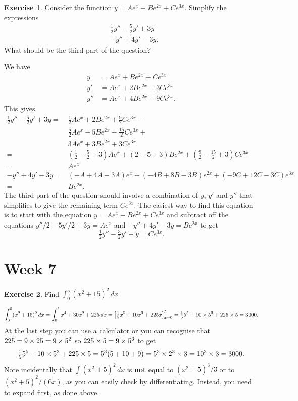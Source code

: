 \documentclass[a4paper]{amsart}
\theoremstyle{definition}
\newtheorem{exercise}{Exercise}[section]
\newenvironment{solution}{{\noindent \bf Solution:}}{}
\begin{document}
\begin{exercise}\label{ex-diffproj}
Consider the function $y=Ae^x+Be^{2x}+Ce^{3x}$.  Simplify
 the expressions
 \begin{align*}
   & \tfrac{1}{2}y'' - \tfrac{5}{2}y' + 3y \\
   & -y'' + 4 y' - 3y.
 \end{align*}
 What should be the third part of the question?
\end{exercise}
\begin{solution}
We have 
 \begin{align*}
  y   &= Ae^x +  Be^{2x} +  Ce^{3x} \\
  y'  &= Ae^x + 2Be^{2x} + 3Ce^{3x} \\
  y'' &= Ae^x + 4Be^{2x} + 9Ce^{3x}.
 \end{align*}
 This gives
 \begin{align*}
  \tfrac{1}{2}y'' - \tfrac{5}{2}y' + 3y 
   =& \tfrac{1}{2}Ae^x + 2Be^{2x} + \tfrac{9}{2}Ce^{3x} - \\
    & \tfrac{5}{2}Ae^x - 5Be^{2x} - \tfrac{15}{2}Ce^{3x} + \\
    & 3Ae^x + 3Be^{2x} + 3Ce^{3x} \\
   =& (\tfrac{1}{2}-\tfrac{5}{2}+3)Ae^x +
      (2-5+3)Be^{2x} + (\tfrac{9}{2}-\tfrac{15}{2}+3)Ce^{3x} \\
   =& Ae^x \\
  -y''+4y'-3y 
   =& (-A+4A-3A)e^x + (-4B+8B-3B)e^{2x} + (-9C+12C-3C)e^{3x} \\
   =& Be^{2x}.
 \end{align*}
 The third part of the question should involve a combination
 of $y$, $y'$ and $y''$ that simplifies to give the
 remaining term $Ce^{3x}$.  The easiest way to find this
 equation is to start with the equation
 $y=Ae^x+Be^{2x}+Ce^{3x}$ and subtract off the equations
 $y''/2-5y'/2+3y=Ae^x$ and $-y''+4y'-3y=Be^{2x}$ to get
 \[ \tfrac{1}{2}y''-\tfrac{3}{2}y'+y=Ce^{3x}. \]
\end{solution}

\section*{Week 7}
\addtocounter{section}{1}\setcounter{exercise}{0}

\begin{exercise}
 Find $\int_0^5 (x^2+15)^2\,dx$
\end{exercise}
\begin{solution}
 \[
  \int_0^5 (x^2+15)^2\,dx
  = \int_0^5 x^4 + 30 x^2 + 225 \, dx 
   = \left[ \tfrac{1}{5} x^5 + 10 x^3 + 225 x\right]_{x=0}^5 
   = \tfrac{1}{5}5^5 + 10\times 5^3 + 225 \times 5 = 3000.
 \]
 At the last step you can use a calculator or you can recognise that
 $225=9\times 25=9\times 5^2$ so $225\times 5=9\times 5^3$ to get 
 \[ \tfrac{1}{5}5^5 + 10\times 5^3 + 225 \times 5 = 
     5^3(5+10+9) = 5^3\times 2^3\times 3 = 10^3\times 3 = 3000.
 \]
 Note incidentally that $\int (x^2+5)^2\,dx$ is \textbf{not} equal to
 $(x^2+5)^3/3$ or to $(x^2+5)^2/(6x)$, as you can easily check by
 differentiating.  Instead, you need to expand first, as done above.
\end{solution}
\end{document}
